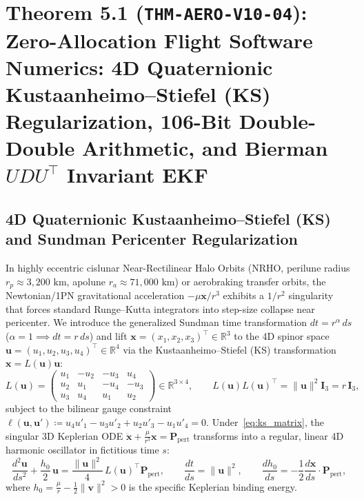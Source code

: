 \documentclass[11pt,a4paper]{article}
\theoremstyle{plain}
\theoremstyle{definition}
\theoremstyle{remark}
\begin{document}
\section{\texorpdfstring{Theorem 5.1 (\texttt{THM-AERO-V10-04}): Zero-Allocation Flight Software Numerics: 4D Quaternionic Kustaanheimo--Stiefel (KS) Regularization, 106-Bit Double-Double Arithmetic, and Bierman $UDU^\top$ Invariant EKF}{Theorem 5.1 (THM-AERO-V10-04): Zero-Allocation Flight Software Numerics: 4D Quaternionic Kustaanheimo-Stiefel (KS) Regularization, 106-Bit Double-Double Arithmetic, and Bierman UDU^T Invariant EKF}}

\subsection{4D Quaternionic Kustaanheimo--Stiefel (KS) and Sundman Pericenter Regularization}

In highly eccentric cislunar Near-Rectilinear Halo Orbits (NRHO, perilune radius $r_p \approx 3,200\text{ km}$, apolune $r_a \approx 71,000\text{ km}$) or aerobraking transfer orbits, the Newtonian/1PN gravitational acceleration $-\mu\mathbf{x}/r^3$ exhibits a $1/r^2$ singularity that forces standard Runge--Kutta integrators into step-size collapse near pericenter. We introduce the generalized Sundman time transformation $dt = r^\alpha\,ds$ ($\alpha = 1 \implies dt = r\,ds$) and lift $\mathbf{x} = (x_1, x_2, x_3)^\top \in \mathbb{R}^3$ to the 4D spinor space $\mathbf{u} = (u_1, u_2, u_3, u_4)^\top \in \mathbb{R}^4$ via the Kustaanheimo--Stiefel (KS) transformation $\mathbf{x} = L(\mathbf{u})\mathbf{u}$:
\begin{equation}\label{eq:ks_matrix}
  L(\mathbf{u}) = \begin{pmatrix}
    u_1 & -u_2 & -u_3 &  u_4 \\
    u_2 &  u_1 & -u_4 & -u_3 \\
    u_3 &  u_4 &  u_1 &  u_2
  \end{pmatrix} \in \mathbb{R}^{3\times 4}, \qquad L(\mathbf{u})L(\mathbf{u})^\top = \|\mathbf{u}\|^2 \mathbf{I}_3 = r\,\mathbf{I}_3,
\end{equation}
subject to the bilinear gauge constraint $\ell(\mathbf{u}, \mathbf{u}') \coloneqq u_4 u'_1 - u_3 u'_2 + u_2 u'_3 - u_1 u'_4 = 0$. Under~\eqref{eq:ks_matrix}, the singular 3D Keplerian ODE $\ddot{\mathbf{x}} + \frac{\mu}{r^3}\mathbf{x} = \mathbf{P}_{\text{pert}}$ transforms into a regular, linear 4D harmonic oscillator in fictitious time $s$:
\begin{equation}\label{eq:ks_oscillator}
  \frac{d^2\mathbf{u}}{ds^2} + \frac{h_0}{2}\,\mathbf{u} = \frac{\|\mathbf{u}\|^2}{4}\,L(\mathbf{u})^\top \mathbf{P}_{\text{pert}}, \qquad \frac{dt}{ds} = \|\mathbf{u}\|^2, \qquad \frac{dh_0}{ds} = -\frac{1}{2}\frac{d\mathbf{x}}{ds}\cdot \mathbf{P}_{\text{pert}},
\end{equation}
where $h_0 = \frac{\mu}{r} - \frac{1}{2}\|\mathbf{v}\|^2 > 0$ is the specific Keplerian binding energy.
\end{document}
